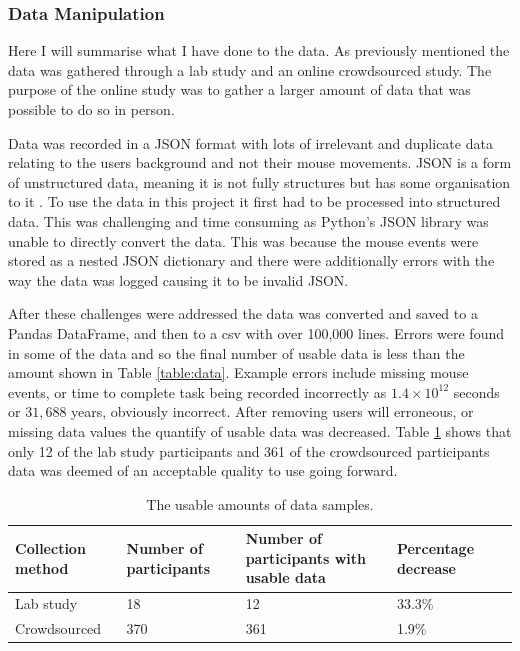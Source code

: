 \documentclass{article}
\begin{document}


\subsubsection{Data Manipulation}

Here I will summarise what I have done to the data.
As previously mentioned the data was gathered through a lab study and an online crowdsourced study.
The purpose of the online study was to gather a larger amount of data that was possible to do so in person.

Data was recorded in a JSON format with lots of irrelevant and duplicate data relating to the users background and not their mouse movements.
JSON is a form of unstructured data, meaning it is not fully structures but has some organisation to it \cite{ronk2014structured}.
To use the data in this project it first had to be processed into structured data.
This was challenging and time consuming as Python's JSON library was unable to directly convert the data.
This was because the mouse events were stored as a nested JSON dictionary and there were additionally errors with the way the data was logged causing it to be invalid JSON.

After these challenges were addressed the data was converted and saved to a Pandas DataFrame, and then to a csv with over 100,000 lines.
Errors were found in some of the data and so the final number of usable data is less than the amount shown in Table \ref{table:data}.
Example errors include missing mouse events, or time to complete task being recorded incorrectly as 
$1.4 \times 10^{12}$ seconds or $31,688$ years, obviously incorrect.
After removing users will erroneous, or missing data values the quantify of usable data was decreased.
Table \ref{table:UseableData} shows that only 12 of the lab study participants and 361 of the crowdsourced participants data was deemed of an acceptable quality to use going forward.

\begin{table}[ht]
    \caption{\label{table:UseableData} The usable amounts of data samples.}
    \small
    \begin{tabular}{llp{2.3cm}ll}
        \hline
        Collection method   & Number of participants & Number of participants with usable data  & Percentage decrease \\  \hline
        Lab study           & 18                        & 12                                    & 33.3\%  \\
        Crowdsourced        & 370                       & 361                                   & 1.9\%  \\  \hline
    \end{tabular}
\end{table}
\end{document}
